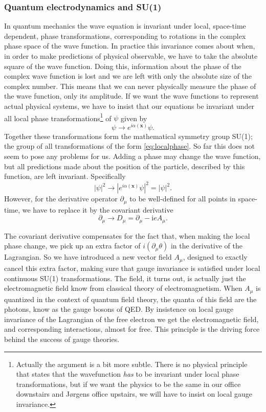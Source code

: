 \subsubsection{Quantum electrodynamics and SU(1)}
In quantum mechanics the wave equation is invariant under local, space-time dependent, phase transformations, corresponding to rotations in the complex phase space of the wave function. In practice this invariance comes about when, in order to make predictions of physical observable, we have to take the absolute square of the wave function. Doing this, information about the phase of the complex wave function is lost and we are left with only the absolute size of the complex number. This means that we can never physically measure the phase of the wave function, only its amplitude. If we want the wave functions to represent actual physical systems, we have to insist that our equations be invariant under all local phase transformations\footnote{Actually the argument is a bit more subtle. There is no physical principle that states that the wavefunction \emph{has} to be invariant under local phase transformations, but if we want the physics to be the same in our office downstairs and Jørgens office upstairs, we will have to insist on local gauge invariance.} of $\psi$ given by
\begin{equation} \label{eq:localphase}
    \psi \rightarrow e^{i\alpha(\mathbf{x})} \psi.
\end{equation}
Together these transformations form the mathematical symmetry group SU(1); the group of all transformations of the form \eqref{eq:localphase}.  So far this does not seem to pose any problems for us. Adding a phase may change the wave function, but all predictions made about the position of the particle, described by this function, are left invariant. Specifically
\begin{equation}
	|\psi|^2 \rightarrow |e^{i\alpha(\mathbf{x})} \psi|^2 = |\psi|^2.
\end{equation}
However, for the derivative operator $\partial_\mu$ to be well-defined for all points in space-time, we have to replace it by the covariant derivative
\begin{equation} \label{eq:covariant}
	\partial_\mu \rightarrow D_\mu = \partial_\mu - \textrm{i}e A_\mu.
\end{equation}

The covariant derivative compensates for the fact that, when making the local phase change, we pick up an extra factor of $i (\partial_\mu \theta)$ in the derivative of the Lagrangian. So we have introduced a new vector field $A_\mu$, designed to exactly cancel this extra factor, making sure that gauge invariance is satisfied under local continuous SU(1) transformations. The field, it turns out, is actually just the electromagnetic field know from classical theory of electromagnetism. When $A_\mu$ is quantized in the context of quantum field theory, the quanta of this field are the photons, know as the gauge bosons of QED. By insistence on local gauge invariance of the Lagrangian of the free electron we get the electromagnetic field, and corresponding interactions, almost for free. This principle is the driving force behind the success of gauge theories.

